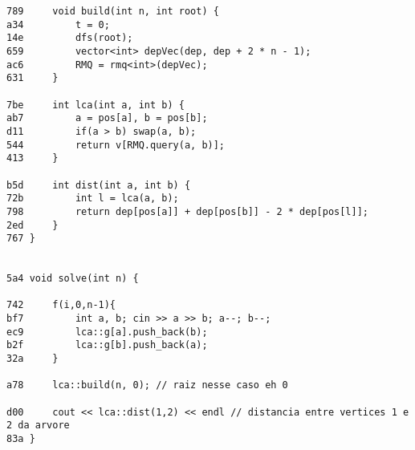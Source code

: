 \documentclass[11pt, a4paper, twoside]{article}
\begin{document}
\begin{lstlisting}
789     void build(int n, int root) {
a34         t = 0;
14e         dfs(root);
659         vector<int> depVec(dep, dep + 2 * n - 1);
ac6         RMQ = rmq<int>(depVec);
631     }
        
7be     int lca(int a, int b) {
ab7         a = pos[a], b = pos[b];
d11         if(a > b) swap(a, b);
544         return v[RMQ.query(a, b)];
413     }
        
b5d     int dist(int a, int b) {
72b         int l = lca(a, b);
798         return dep[pos[a]] + dep[pos[b]] - 2 * dep[pos[l]];
2ed     }
767 }

   
5a4 void solve(int n) {
        
742 	f(i,0,n-1){
bf7         int a, b; cin >> a >> b; a--; b--;
ec9         lca::g[a].push_back(b);
b2f         lca::g[b].push_back(a);
32a     }
        
a78     lca::build(n, 0); // raiz nesse caso eh 0
      
d00 	cout << lca::dist(1,2) << endl // distancia entre vertices 1 e 2 da arvore
83a }

\end{lstlisting}
\end{document}
